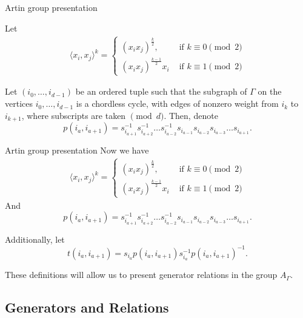 \documentclass{beamer}
\begin{document}
\begin{frame}{Artin group presentation}
\begin{block}

Let
\begin{align*}
\langle x_i,x_j \rangle ^k = \begin{cases}
(x_ix_j)^{\frac{k}{2}}, &\text{ if }k \equiv 0 \pmod 2\\
(x_ix_j)^{\frac{k-1}{2}}x_i &\text{ if } k \equiv 1 \pmod 2
\end{cases}
\end{align*}
\end{block}

\begin{block}

Let $(i_0,\ldots, i_{d-1})$ be an ordered tuple such that the subgraph of $\Gamma$ on the vertices $i_0,\ldots, i_{d-1}$ is a chordless cycle, with edges of nonzero weight from $i_k$ to $i_{k+1}$, where subscripts are taken $\pmod d.$ Then, denote $$p(i_a,i_{a+1}) = s_{i_{a+1}}^{-1}s_{i_{a+2}}^{-1}\dots s_{i_{a-2}}^{-1}s_{i_{a-1}}s_{i_{a-2}}s_{i_{a-3}}\dots s_{i_{a+1}}.$$
\end{block}

\end{frame}
\begin{frame}{Artin group presentation}
Now we have 
\begin{align*}
\langle x_i,x_j \rangle ^k = \begin{cases}
(x_ix_j)^{\frac{k}{2}}, &\text{ if }k \equiv 0 \pmod 2\\
(x_ix_j)^{\frac{k-1}{2}}x_i &\text{ if } k \equiv 1 \pmod 2
\end{cases}
\end{align*}
And $$p(i_a,i_{a+1}) = s_{i_{a+1}}^{-1}s_{i_{a+2}}^{-1}\dots s_{i_{a-2}}^{-1}s_{i_{a-1}}s_{i_{a-2}}s_{i_{a-3}}\dots s_{i_{a+1}}.$$

Additionally, let $$t(i_a,i_{a+1}) = s_{i_a} p(i_a,i_{a+1})  s_{i_a}^{-1}p(i_a,i_{a+1})^{-1}.$$

These definitions will allow us to present generator relations in the group $A_{\Gamma}$.

\end{frame}


\subsection{Generators and Relations}
\end{document}
